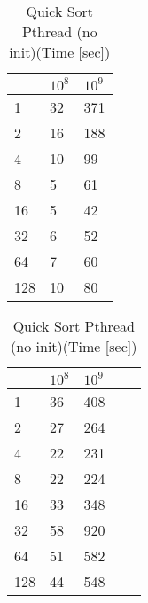 \documentclass{article}
\begin{document}
\begin{table}[h!]
\begin{minipage}{0.48\textwidth}
\centering
\caption{Quick Sort OMP (no init) (Time [sec])}
\label{my-label}
\begin{tabular}{l|ll}
&      $10^8$           &    $10^9$ \\ \hline
1       &       32   &   371        \\ \hline
2       &       16   &   188        \\ \hline
4       &       10   &   99         \\ \hline
8       &       5   &   61         \\ \hline
16      &       5   &   42           \\ \hline
32      &       6   &   52         \\ \hline
64      &       7   &   60         \\ \hline
128     &       10   &   80         \\ 
\end{tabular}
\end{minipage}%
\begin{minipage}{0.48\textwidth}
\centering
\caption{Quick Sort Pthread (no init)(Time [sec])}
\label{my-label}
\begin{tabular}{l|llll}
&      $10^8$       &    $10^9$       \\ \hline
1       &       36    &   408 \\ \hline
2       &       27    &   264 \\ \hline
4       &       22    &   231 \\ \hline
8       &       22    &   224     \\ \hline
16      &       33    &   348 \\ \hline
32      &       58    &   920 \\ \hline
64      &       51    &   582 \\ \hline
128     &       44    &   548 \\ 
\end{tabular}
\end{minipage}%
\end{table}
\end{document}
